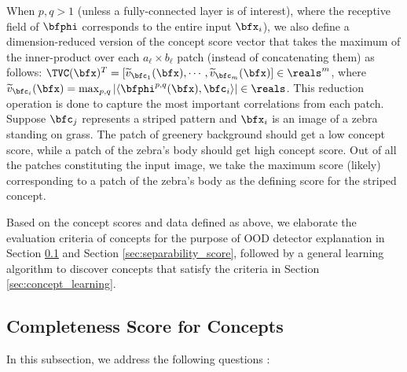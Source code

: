 When $p, q > 1$ (unless a fully-connected layer is of interest), where the receptive field of $\bfphi$ corresponds to the entire input $\bfx_i$), we also define a dimension-reduced version of the concept score vector that takes the maximum of the inner-product over each $a_\ell \times b_\ell$ patch (instead of concatenating them) as follows: $\TVC(\bfx)^T = [\widetilde{v}_{\bfc_1}(\bfx), \cdots, \widetilde{v}_{\bfc_m}(\bfx)] \in \reals^m$, where $\widetilde{v}_{\bfc_i}(\bfx) = \max_{p, q} |\langle \bfphi^{p,q}(\bfx), \bfc_i \rangle| \in \reals$.
This reduction operation is done to capture the most important correlations from each patch.
Suppose $\bfc_j$ represents a striped pattern and $\bfx_i$ is an image of a zebra standing on grass.
The patch of greenery background should get a low concept score, while a patch of the zebra's body should get high concept score.
Out of all the patches constituting the input image, we take the maximum score (likely) corresponding to a patch of the zebra's body as the defining score for the striped concept.

Based on the concept scores and data defined as above, we elaborate the evaluation criteria of concepts for the purpose of OOD detector explanation in Section \ref{sec:completeness_score} and Section \ref{sec:separability_score}, followed by a general learning algorithm to discover concepts that satisfy the criteria in Section \ref{sec:concept_learning}.

\subsection{Completeness Score for Concepts}
\label{sec:completeness_score}
In this subsection, we address the following questions : \textit{}

